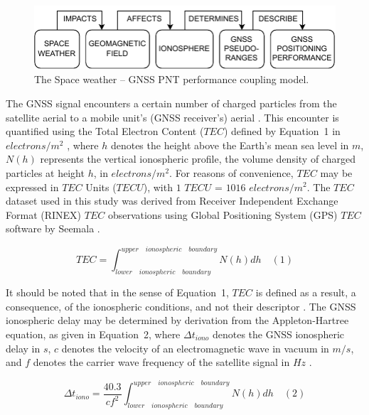 \let\LaTeXcline\cline\documentclass[sn-mathphys-num]{sn-jnl}\let\cline\LaTeXcline
\begin{document}
\begin{figure}[!ht]
 \centering
 \includegraphics[width=0.89\linewidth]{SpaceWeather-TwoLines.drawio.pdf}
    \caption{The Space weather – GNSS PNT performance coupling model.}
    \label{fig:SpaceWeather}
\end{figure}

The GNSS signal encounters a certain number of charged particles from the satellite aerial to a mobile unit’s (GNSS receiver’s) aerial \cite{schaer1999mapping, prolss2012physics}. This encounter is quantified using the Total Electron Content ($TEC$) defined by Equation~1 in $electrons/m^{2}$ \cite{spilker1996global, schaer1999mapping, davies1990ionospheric}, where $h$ denotes the height above the Earth’s mean sea level in $m$, $N(h)$ represents the vertical ionospheric profile, the volume density of charged particles at height $h$, in $electrons/m^{2}$. For reasons of convenience, $TEC$ may be expressed in $TEC$ Units ($TECU$), with $1$ $TECU$ = $1016$ $electrons/m^{2}$. The $TEC$ dataset used in this study was derived from Receiver Independent Exchange Format (RINEX) $TEC$ observations using Global Positioning System (GPS) $TEC$ software by Seemala \cite{SEEMALA202363}.

\begin{equation}
	TEC = \int_{lower \quad ionospheric \quad boundary}^{upper \quad ionospheric \quad boundary}N(h)dh
	\quad\left(1\right)
\end{equation}

It should be noted that in the sense of Equation~1, $TEC$ is defined as a result, a consequence, of the ionospheric conditions, and not their descriptor \cite{spilker1996global}. The GNSS ionospheric delay may be determined by derivation from the Appleton-Hartree equation, as given in Equation~2, where $\Delta t_{iono}$ denotes the GNSS ionospheric delay in $s$, $c$ denotes the velocity of an electromagnetic wave in vacuum in $m/s$, and $f$ denotes the carrier wave frequency of the satellite signal in $Hz$ \cite{spilker1996global, schaer1999mapping}.

\begin{equation}
	\Delta t_{iono} = \frac{40.3}{c f^{2}} \int_{lower \quad ionospheric \quad boundary}^{upper \quad ionospheric \quad boundary}N(h)dh
	\quad\left(2\right)
\end{equation}
\end{document}
